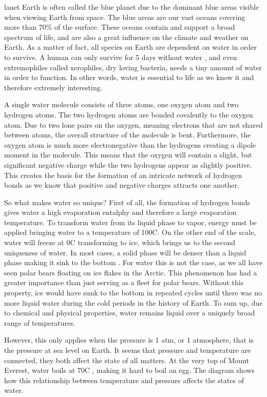 \noindent
{}lanet Earth is often called the blue planet due to the dominant blue areas visible when viewing Earth from space.
The blue areas are our vast oceans covering more than 70\% \cite{WikiEarth} of the surface.
These oceans contain and support a broad spectrum of life, and are also a great influence on the climate and weather on Earth.
As a matter of fact, all species on Earth are dependent on water in order to survive.
A human can only survive for 5 days without water \cite{SurviveWater}, and even extremophiles called xerophiles, dry loving bacteria, needs a tiny amount of water in order to function.
In other words, water is essential to life as we know it and therefore extremely interesting. 

A single water molecule consists of three atoms, one oxygen atom and two hydrogen atoms.
The two hydrogen atoms are bonded covalently to the oxygen atom.
Due to two lone pairs on the oxygen, meaning electrons that are not shared between atoms, the overall structure of the molecule is bent.
Furthermore, the oxygen atom is much more electronegative than the hydrogens creating a dipole moment in the molecule.
This means that the oxygen will contain a slight, but significant negative charge while the two hydrogens appear as slightly positive.
This creates the basis for the formation of an intricate network of hydrogen bonds as we know that positive and negative charges attracts one another.  

So what makes water so unique?
First of all, the formation of hydrogen bonds gives water a high evaporation entalphy and therefore a large evaporation temperature.
To transform water from its liquid phase to vapor, energy must be applied bringing water to a temperature of 100\degree C.
On the other end of the scale, water will freeze at 0\degree C transforming to ice, which brings us to the second uniqueness of water.
In most cases, a solid phase will be denser than a liquid phase making it sink to the bottom \cite{SolidWater}.
For water this is not the case, as we all have seen polar bears floating on ice flakes in the Arctic.
This phenomenon has had a greater importance than just serving as a fleet for polar bears.
Without this property, ice would have sunk to the bottom in repeated cycles until there was no more liquid water during the cold periods in the history of Earth.
To sum up, due to chemical and physical properties, water remains liquid over a uniquely broad range of temperatures.

However, this only applies when the pressure is 1 atm, or 1 atmosphere, that is the pressure at sea level on Earth.
It seems that pressure and temperature are connected, they both affect the state of all matters.
At the very top of Mount Everest, water boils at 70\degree C \cite{WaterEverest}, making it hard to boil an egg.
The diagram shows how this relationship between temperature and pressure affects the states of water.

